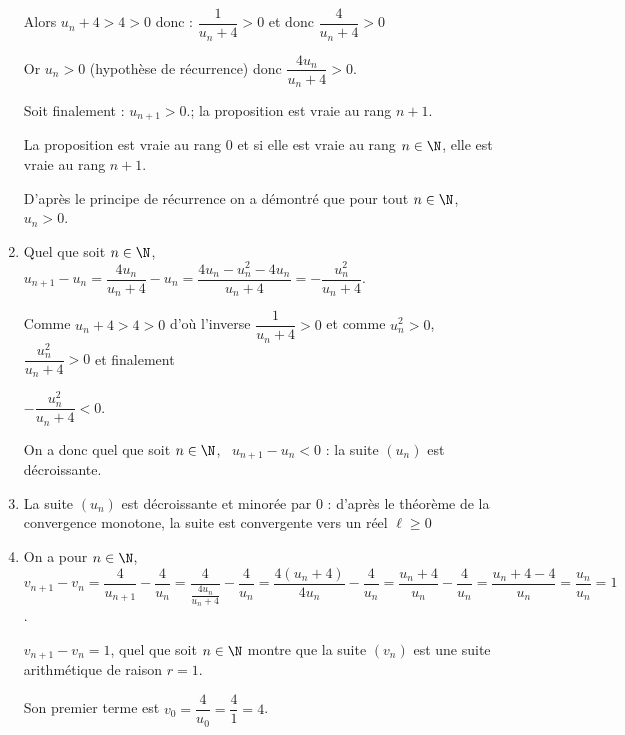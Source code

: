 \begin{enumerate}
Alors $u_n + 4  >4 > 0$ donc : $ \dfrac{1}{u_n + 4} >0$ et donc $ \dfrac{4}{u_n + 4} >0$

Or $u_n>0$ (hypothèse de récurrence) donc $\dfrac{4u_n}{u_n + 4}>0$.

Soit finalement : $u_{n+1} >0$.; la proposition est vraie au rang $n + 1$.

La proposition est vraie au rang $0$ et si elle est vraie au rang $n \in \N$, elle est vraie au rang $n + 1$.

D'après le principe de récurrence on a démontré que pour tout $n \in \N$, \, $u_n > 0$.
\item %
Quel que soit $n \in \N$, \, $u_{n+1} - u_n = \dfrac{4u_n}{u_n + 4} - u_n = \dfrac{4u_n - u_n^2 - 4u_n}{u_n + 4} = - \dfrac{u_n^2}{u_n + 4}$.

Comme $u_n + 4 > 4 > 0$ d'où l'inverse $\dfrac{1}{u_n + 4} > 0$ et comme $u_n^2 > 0$, $\dfrac{u_n^2}{u_n + 4} > 0$ et finalement 

$- \dfrac{u_n^2}{u_n + 4} < 0$.

On a donc quel que soit $n \in \N$, \, $u_{n+1} - u_n < 0$ : la suite $\left(u_n\right)$ est décroissante.
\item %
La suite $\left(u_n\right)$ est décroissante et minorée par $0$ : d'après le théorème de la convergence monotone, la suite est convergente vers un réel $\ell \geqslant 0$

\item %



On a pour $n \in \N$, \\$v_{n+1} - v_n = \dfrac{4}{u_{n+1}} - \dfrac{4}{u_n} = \dfrac{4}{\frac{4u_n}{u_n + 4}} - \dfrac{4}{u_n} = \dfrac{4\left(u_n + 4 \right)}{4u_n} - \dfrac{4}{u_n} = \dfrac{u_n + 4}{u_n} - \dfrac{4}{u_n} = \dfrac{u_n + 4 - 4}{u_n} = \dfrac{u_n}{u_n} = 1$.

$v_{n+1} - v_n = 1$, quel que soit $n \in \N$ montre que la suite $\left(v_n\right)$ est une suite arithmétique de raison $r = 1$.

Son premier terme est $v_0 = \dfrac{4}{u_0} = \dfrac{4}{1} = 4$.


\end{enumerate}
